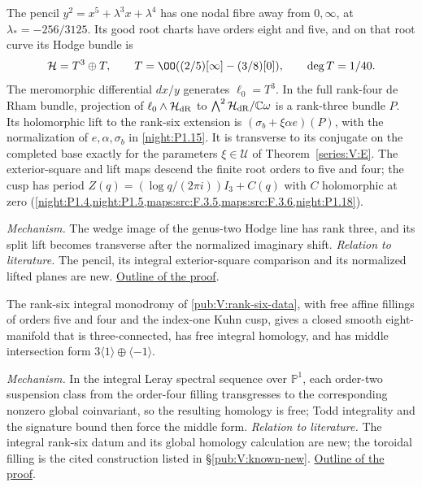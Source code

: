 \hypertarget{main-V-C}{}
\begin{maintheorem}
\hypertarget{tag-03KT}{}\label{series:V:C}
The pencil $y^2=x^5+\lambda^3x+\lambda^4$ has one nodal
fibre away from $0,\infty$, at $\lambda_*=-256/3125$.
Its good root charts have orders eight and five, and on that root
curve its Hodge bundle is
\[
 \mathcal H=T^3\oplus T,\qquad
 T=\OO((2/5)[\infty]-(3/8)[0]),\qquad \deg T=1/40.
\]
The meromorphic differential $dx/y$ generates $\ell_0=T^3$.
In the full rank-four de Rham bundle, projection of
$\ell_0\wedge\mathcal H_{\rm dR}$ to
$\bigwedge^2\mathcal H_{\rm dR}/\mathbb C\omega$
is a rank-three bundle $P$.  Its holomorphic lift to the rank-six extension is $(\sigma_b+\xi\alpha e)(P)$, with the
normalization of $e,\alpha,\sigma_b$ in \cref{night:P1.15}.
It is transverse to its conjugate on the completed base exactly
for the parameters $\xi\in\mathcal U$ of Theorem~\ref{series:V:E}.
The exterior-square and lift maps descend the finite root
orders to five and four; the cusp has period
$Z(q)=(\log q/(2\pi i))I_3+C(q)$ with $C$ holomorphic at zero
(\cref{night:P1.4,night:P1.5,maps:src:F.3.5,maps:src:F.3.6,night:P1.18}).

\end{maintheorem}

\textit{Mechanism.} The wedge image of the genus-two Hodge line has rank three, and its split lift becomes transverse after the normalized imaginary shift.
\textit{Relation to literature.} The pencil, its integral exterior-square comparison and its normalized lifted planes are new.
\hyperlink{outline-V-C}{Outline of the proof}.

\hypertarget{main-V-B}{}
\begin{maintheorem}
\hypertarget{tag-03KS}{}\label{series:V:B}
The rank-six integral monodromy of \cref{pub:V:rank-six-data}, with free affine fillings of orders five and four and the index-one Kuhn cusp, gives a closed smooth eight-manifold that is three-connected, has free integral homology, and has middle intersection form $3\langle1\rangle\oplus\langle-1\rangle$.

\end{maintheorem}

\textit{Mechanism.} In the integral Leray spectral sequence over $\mathbb P^1$, each order-two suspension class from the order-four filling transgresses to the corresponding nonzero global coinvariant, so the resulting homology is free; Todd integrality and the signature bound then force the middle form.
\textit{Relation to literature.} The integral rank-six datum and its global homology calculation are new; the toroidal filling is the cited construction listed in \S\ref{pub:V:known-new}.
\hyperlink{outline-V-B}{Outline of the proof}.

